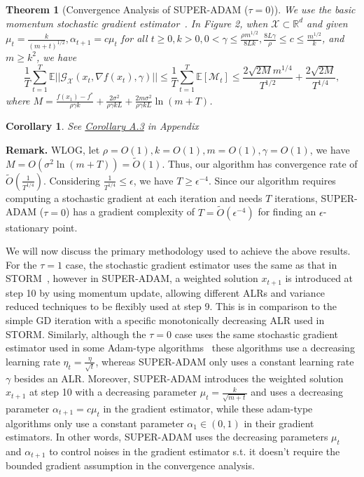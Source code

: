 \documentclass{article}
\newtheorem{theorem}{Theorem}[section]
\newtheorem{corollary}{Corollary}[section]
\begin{document}
\begin{theorem}[Convergence Analysis of SUPER-ADAM ($\tau = 0$)]
	We use the basic momentum stochastic gradient estimator~\cite{https://doi.org/10.48550/arxiv.1412.6980}.
	In Figure 2, when $\mathcal{X}\subset \mathbb{R}^d$ and given $\mu_t = \frac{k}{(m+t)^{1/2}}, \alpha_{t+1} = c\mu_t$ for all $t\geq 0, k > 0, 0 < \gamma \leq \frac{\rho m^{1/2}}{8Lk}, \frac{8L\gamma}{\rho}\leq c\leq \frac{m^{1/2}}{k}$,
	and $m\geq k^2$, we have
	\begin{equation}
		\frac{1}{T}\sum^T_{t=1}\mathbb{E}||\mathcal{G}_{\mathcal{X}}(x_t, \nabla f(x_t), \gamma)||\leq
		\frac{1}{T}\sum^T_{t=1}\mathbb{E}[\mathcal{M}_t]\leq
		\frac{2\sqrt{2M}m^{1/4}}{T^{1/2}} + \frac{2\sqrt{2M}}{T^{1/4}},
	\end{equation}
	where $M = \frac{f(x_1) - f^*}{\rho\gamma k} + \frac{2\sigma^2}{\rho\gamma kL} + \frac{2m\sigma^2}{\rho\gamma kL}\ln(m+T)$.
\end{theorem}
\begin{corollary}
	See \hyperref[coro51appendix]{Corollary A.3} in Appendix
\end{corollary}
\textbf{Remark.} WLOG, let $\rho = O(1), k = O(1), m = O(1), \gamma = O(1)$, we have $M = O(\sigma^2 \ln(m+T)) = \tilde{O}(1)$. Thus, our algorithm has convergence rate of $\tilde{O}\left(\frac{1}{T^{1/4}}\right)$.
Considering $\frac{1}{T^{1/4}}\leq\epsilon$, we have $T\geq\epsilon^{-4}$. Since our algorithm requires computing a stochastic gradient at each iteration and needs $T$ iterations, SUPER-ADAM ($\tau = 0$) has a gradient complexity of $T = \tilde{O}(\epsilon^{-4})$ for finding an
$\epsilon$-stationary point.

We will now discuss the primary methodology used to achieve the above results. For the $\tau = 1$ case, the stochastic gradient estimator uses the same as that in STORM~\cite{https://doi.org/10.48550/arxiv.1905.10018}, however in SUPER-ADAM, a weighted solution $x_{t+1}$ is introduced at step 10 by
using momentum update, allowing different ALRs and variance reduced techniques to be flexibly used at step 9. This is in comparison to the simple GD iteration with a specific monotonically decreasing ALR used in STORM. Similarly, although the $\tau = 0$ case uses the
same stochastic gradient estimator used in some Adam-type algorithms~\cite{https://doi.org/10.48550/arxiv.1412.6980, https://doi.org/10.48550/arxiv.1904.09237, https://doi.org/10.48550/arxiv.2010.07468} these algorithms use a decreasing learning rate
$\eta_t = \frac{\eta}{\sqrt{t}}$, whereas SUPER-ADAM only uses a constant learning rate $\gamma$ besides an ALR. Moreover, SUPER-ADAM introduces the weighted solution $x_{t+1}$ at step 10 with a decreasing
parameter $\mu_t = \frac{k}{\sqrt{m+t}}$ and uses a decreasing parameter $\alpha_{t+1} = c\mu_t$ in the gradient estimator, while these adam-type algorithms only use a constant parameter $\alpha_1\in (0,1)$ in their gradient estimators. In other words, SUPER-ADAM uses the
decreasing parameters $\mu_t$ and $\alpha_{t+1}$ to control noises in the gradient estimator s.t. it doesn't require the bounded gradient assumption in the convergence analysis.
\end{document}

